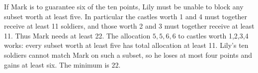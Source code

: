 If Mark is to guarantee six of the ten points, Lily must be unable to block any subset worth at least five. In particular the castles worth 1 and 4 must together receive at least 11 soldiers, and those worth 2 and 3 must together receive at least 11. Thus Mark needs at least 22. The allocation $5,5,6,6$ to castles worth 1,2,3,4 works: every subset worth at least five has total allocation at least 11. Lily's ten soldiers cannot match Mark on such a subset, so he loses at most four points and gains at least six. The minimum is $\boxed{22}$.
